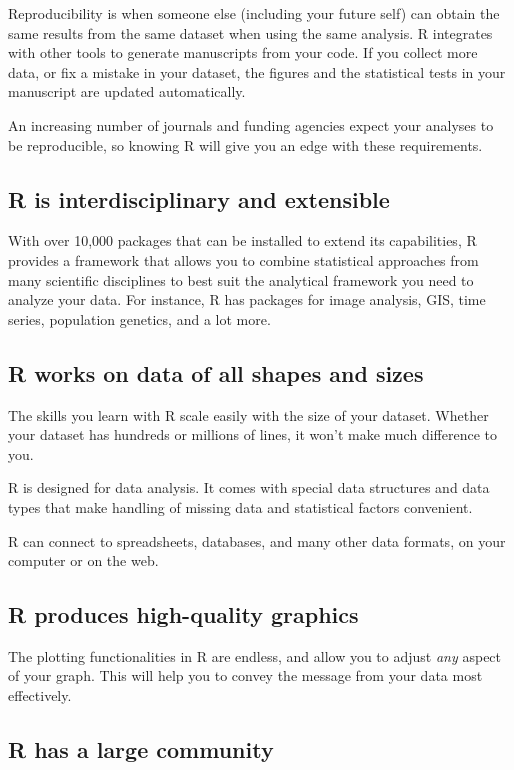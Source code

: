 \documentclass[11pt]{article}
\begin{document}
Reproducibility is when someone else (including your future self) can obtain the same results from the same dataset when using the same analysis.  R integrates with other tools to generate manuscripts from your code. If you collect more data, or fix a mistake in your dataset, the figures and the statistical tests in your manuscript are updated automatically.

An increasing number of journals and funding agencies expect your analyses to be reproducible, so knowing R will give you an edge with these requirements.

\subsection*{R is interdisciplinary and extensible}
\label{sec-2-3}

With over 10,000 packages that can be installed to extend its capabilities, R provides a framework that allows you to combine statistical approaches from many scientific disciplines to best suit the analytical framework you need to analyze your data. For instance, R has packages for image analysis, GIS, time series, population genetics, and a lot more.

\subsection*{R works on data of all shapes and sizes}
\label{sec-2-4}

The skills you learn with R scale easily with the size of your dataset. Whether your dataset has hundreds or millions of lines, it won't make much difference to you.

R is designed for data analysis. It comes with special data structures and data types that make handling of missing data and statistical factors convenient.

R can connect to spreadsheets, databases, and many other data formats, on your computer or on the web.

\subsection*{R produces high-quality graphics}
\label{sec-2-5}

The plotting functionalities in R are endless, and allow you to adjust \emph{any} aspect of your graph.  This will help you to convey the message from your data most effectively.

\subsection*{R has a large community}
\label{sec-2-6}
\end{document}

